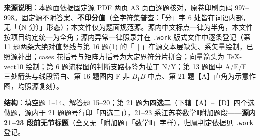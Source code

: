 


\begin{gktip}
\textbf{来源说明}：本题面依据固定源 PDF 两页 A3 页面逐题核对，原卷印刷页码 997–998。固定源不附答案、\textbf{不印分值}（全字符集普查：「分」字 6 处皆在词语内部，无「（N 分）」形态）；本文件仅为题面规范源。源内中文标点一律为半角，本文件按项目约定统一为全角；源内异常一律照录并在 \texttt{.work} 版式文件中逐条登记（第 11 题两条大绝对值竖线与第 16 题(1) 的「$\parallel$」在源文本层缺失、系矢量绘制，已照源补出；cases 花括号与矩阵方括号为大定界符分片拼合；向量箭头为 TeX-vect10 绘制；第 6 题流程图的判断支路标签为拉丁 N/Y；第 13 题图中 A/E/F 三处箭头与线段留白、第 16 题图内 F 非 \(B_{1}B\) 中点、第 21 题【A】直角为示意作图，均照源复刻）。

\textbf{结构}：填空题 1–14、解答题 15–20；第 21 题为\textbf{四选二}（下辖【A】–【D】四个选做题，源内于 21 题题号行印「四选二」），21–23 系江苏卷数学Ⅱ附加题段——\textbf{源内 21–23 段前无节标题}（全文无「附加题」「数学Ⅱ」字样），归属判定依据见 \texttt{.work} 登记。
\end{gktip}



